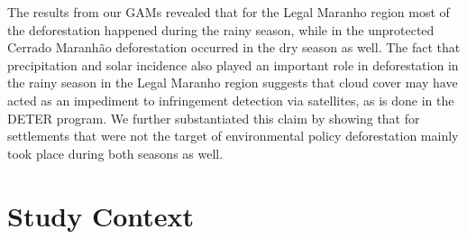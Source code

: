 
The results from our GAMs revealed that for the Legal Maranho region most of the deforestation happened during the rainy season, while in the unprotected Cerrado Maranhão deforestation occurred in the dry season as well.  The fact that precipitation and solar incidence also played an important role in deforestation in the rainy season in the Legal Maranho region suggests that cloud cover may have acted as an impediment to infringement detection via satellites, as is done in the DETER program. We further substantiated this claim by showing that for settlements that were not the target of environmental policy deforestation mainly took place during both seasons as well.     







\section{Study Context}  %
